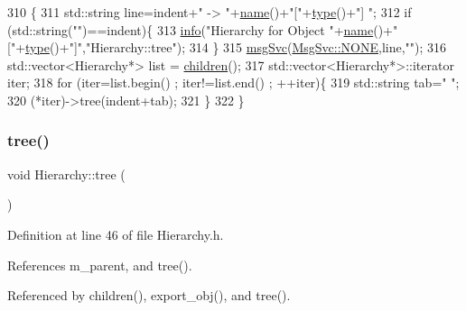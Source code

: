 \begin{DoxyCode}
310                                     \{
311   std::string line=indent+\textcolor{stringliteral}{" -> "}+\hyperlink{classObject_a300f4c05dd468c7bb8b3c968868443c1}{name}()+\textcolor{stringliteral}{"["}+\hyperlink{classObject_a84f99f70f144a83e1582d1d0f84e4e62}{type}()+\textcolor{stringliteral}{"] "};
312   \textcolor{keywordflow}{if} (std::string(\textcolor{stringliteral}{""})==indent)\{
313     \hyperlink{classObject_a644fd329ea4cb85f54fa6846484b84a8}{info}(\textcolor{stringliteral}{"Hierarchy for Object "}+\hyperlink{classObject_a300f4c05dd468c7bb8b3c968868443c1}{name}()+\textcolor{stringliteral}{"["}+\hyperlink{classObject_a84f99f70f144a83e1582d1d0f84e4e62}{type}()+\textcolor{stringliteral}{"]"},\textcolor{stringliteral}{"Hierarchy::tree"});
314   \}
315   \hyperlink{classObject_a3f9d5537ebce0c0f2bf6ae4d92426f3c}{msgSvc}(\hyperlink{classMsgSvc_ae671eb7301996cd049d2da8a65925926a9be9ae32fed8e1e6eba4a58692210fbd}{MsgSvc::NONE},line,\textcolor{stringliteral}{""});
316   std::vector<Hierarchy*> list = \hyperlink{classHierarchy_aa9a76f69e98e052ee1a6e32cea006288}{children}();
317   std::vector<Hierarchy*>::iterator iter;
318   \textcolor{keywordflow}{for} (iter=list.begin() ; iter!=list.end() ; ++iter)\{
319     std::string tab=\textcolor{stringliteral}{"  "};
320     (*iter)->tree(indent+tab);
321   \}
322 \}
\end{DoxyCode}
\mbox{\label{classHierarchy_a594c294c5f60c230e106d522ed008212}} 
\subsubsection{\texorpdfstring{tree()}{tree()}\hspace{0.1cm}{\footnotesize\ttfamily [2/2]}}
{\footnotesize\ttfamily void Hierarchy\+::tree (\begin{DoxyParamCaption}{ }\end{DoxyParamCaption})\hspace{0.3cm}{\ttfamily [inline]}}



Definition at line 46 of file Hierarchy.\+h.



References m\+\_\+parent, and tree().



Referenced by children(), export\+\_\+obj(), and tree().


